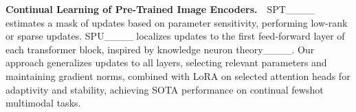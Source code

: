\textbf{Continual Learning of Pre-Trained Image Encoders.}~~SPT____ estimates a mask of updates based on parameter sensitivity, performing low-rank or sparse updates. SPU____ localizes updates to the first feed-forward layer of each transformer block, inspired by knowledge neuron theory____. Our approach generalizes updates to all layers, selecting relevant parameters and maintaining gradient norms, combined with LoRA on selected attention heads for adaptivity and stability,  achieving SOTA performance on continual fewshot multimodal tasks.




